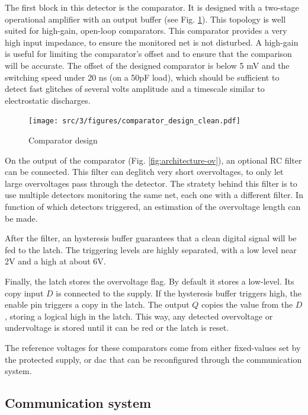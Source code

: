 The first block in this detector is the comparator.
It is designed with a two-stage operational amplifier with an output buffer (see Fig. \ref{fig:comparator-design}).
This topology is well suited for high-gain, open-loop comparators.
This comparator provides a very high input impedance, to ensure the monitored net is not disturbed.
A high-gain is useful for limiting the comparator's offset and to ensure that the comparison will be accurate.
The offset of the designed comparator is below 5 mV and the switching speed under 20 ns (on a 50pF load), which should be sufficient to detect fast glitches of several volts amplitude and a timescale similar to electrostatic discharges.

\begin{figure}[!h]
  \centering
  \texttt{[image: src/3/figures/comparator\_design\_clean.pdf]}
  \caption{Comparator design}
  \label{fig:comparator-design}
\end{figure}

On the output of the comparator (Fig. \ref{fig:architecture-ov}), an optional RC filter can be connected.
This filter can deglitch very short overvoltages, to only let large overvoltages pass through the detector.
The stratety behind this filter is to use multiple detectors monitoring the same net, each one with a different filter.
In function of which detectors triggered, an estimation of the overvoltage length can be made.

After the filter, an hysteresis buffer guarantees that a clean digital signal will be fed to the latch.
The triggering levels are highly separated, with a low level near 2V and a high at about 6V.

Finally, the latch stores the overvoltage flag.
By default it stores a low-level.
Its copy input $D$ is connected to the supply.
If the hysteresis buffer triggers high, the enable pin triggers a copy in the latch.
The output $Q$ copies the value from the $D$, storing a logical high in the latch.
This way, any detected overvoltage or undervoltage is stored until it can be red or the latch is reset.

The reference voltages for these comparators come from either fixed-values set by the protected supply, or \gls{dac} that can be reconfigured through the communication system.

\subsection{Communication system}
\label{sec:comm-system-testchip}

